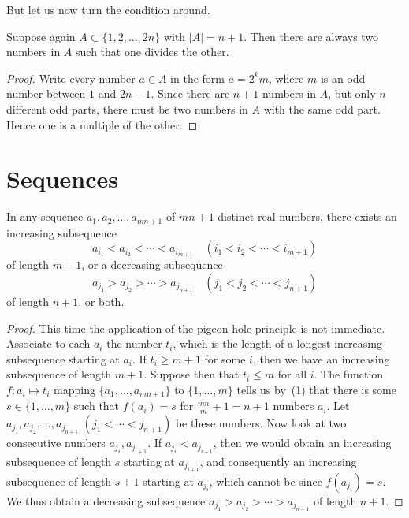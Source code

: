 But let us now turn the condition around.

\begin{theorem}[Claim]
  \label{ch28claim2}
  Suppose again $A \subset \{1, 2, \dots, 2n\}$ with $|A| = n+1$. Then
  there are always two numbers in $A$ such that one divides the other.
\end{theorem}
\begin{proof}
  \leanok
  Write every number $a \in A$ in the form $a = 2^k m$, where $m$ is an odd number between $1$
  and $2n - 1$. Since there are $n + 1$ numbers in $A$, but only $n$ different odd parts, there must
  be two numbers in $A$ with the same odd part. Hence one is a multiple of the other.
\end{proof}

\section{Sequences}

\begin{theorem}
  \label{ch28claim3}
  In any sequence $a_1, a_2, \ldots, a_{mn+1}$ of $mn+1$ distinct real numbers,
  there exists an increasing subsequence
  \[
  a_{i_1} < a_{i_2} < \cdots < a_{i_{m+1}} \quad (i_1 < i_2 < \cdots < i_{m+1})
  \]
  of length $m+1$, or a decreasing subsequence
  \[
  a_{j_1} > a_{j_2} > \cdots > a_{j_{n+1}} \quad (j_1 < j_2 < \cdots < j_{n+1})
  \]
  of length $n+1$, or both.
\end{theorem}
\begin{proof}
  \leanok
  This time the application of the pigeon-hole principle is not immediate.
  Associate to each $a_i$ the number $t_i$, which is the length of a longest
  increasing subsequence starting at $a_i$. If $t_i \geq m+1$ for some $i$,
  then we have an increasing subsequence of length $m+1$. Suppose then
  that $t_i \leq m$ for all $i$. The function $f : a_i \mapsto t_i$ mapping
  $\{a_1, \dots, a_{mn+1}\}$ to $\{1, \dots, m\}$ tells us by~(1) that there
  is some $s \in \{1, \dots, m\}$ such that $f(a_i) = s$ for $\frac{mn}{m} + 1 = n + 1$
  numbers $a_i$. Let $a_{j_1}, a_{j_2}, \dots, a_{j_{n+1}}$ $(j_1 < \cdots < j_{n+1})$
  be these numbers. Now look at two consecutive numbers $a_{j_i}, a_{j_{i+1}}$. If
  $a_{j_i} < a_{j_{i+1}}$, then we would obtain an increasing subsequence of length
  $s$ starting at $a_{j_{i+1}}$, and consequently an increasing subsequence of length
  $s+1$ starting at $a_{j_i}$, which cannot be since $f(a_{j_i}) = s$.
  We thus obtain a decreasing subsequence $a_{j_1} > a_{j_2} > \cdots > a_{j_{n+1}}$
  of length $n+1$.
\end{proof}

